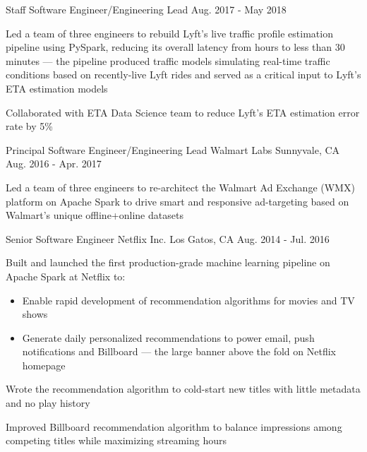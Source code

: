 \begin{cventries}
  \cventry
  {Staff Software Engineer/Engineering Lead} %
  {} %
  {} %
  {Aug. 2017 - May 2018} %
  {
    \begin{cvitems} %
      \item{Led a team of three engineers to rebuild Lyft's live traffic profile estimation pipeline using PySpark, reducing its overall latency from hours to less than 30 minutes --- the pipeline produced traffic models simulating real-time traffic conditions based on recently-live Lyft rides and served as a critical input to Lyft's ETA estimation models}
      \item{Collaborated with ETA Data Science team to reduce Lyft's ETA estimation error rate by 5\%}
    \end{cvitems}
  }

  \cventry
  {Principal Software Engineer/Engineering Lead} %
  {Walmart Labs} %
  {Sunnyvale, CA} %
  {Aug. 2016 - Apr. 2017} %
  {
    \begin{cvitems} %
      \item{Led a team of three engineers to re-architect the Walmart Ad Exchange (WMX) platform on Apache Spark to drive smart and responsive ad-targeting based on Walmart’s unique offline+online datasets}
    \end{cvitems}
  }

  \cventry
  {Senior Software Engineer} %
  {Netflix Inc.} %
  {Los Gatos, CA} %
  {Aug. 2014 - Jul. 2016} %
  {
    \begin{cvitems} %
      \item{Built and launched the first production-grade machine learning pipeline on Apache Spark at Netflix to:}
      \begin{itemize}[label=$\circ$]
        \item{Enable rapid development of recommendation algorithms for movies and TV shows}
        \item{Generate daily personalized recommendations to power email, push notifications and Billboard --- the large banner above the fold on Netflix homepage}
      \end{itemize}
      \item{Wrote the recommendation algorithm to cold-start new titles with little metadata and no play history}
      \item{Improved Billboard recommendation algorithm to balance impressions among competing titles while maximizing streaming hours}
    \end{cvitems}
  }


\end{cventries}
